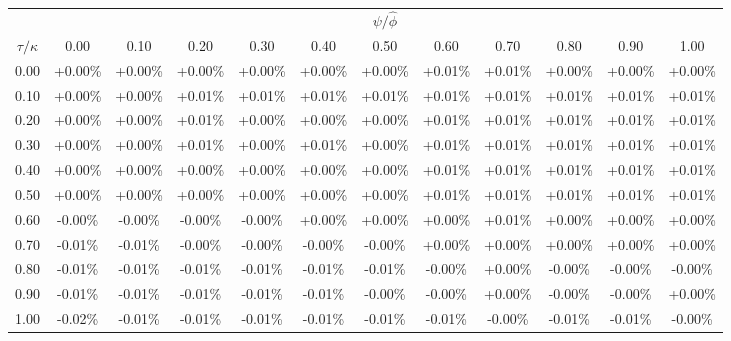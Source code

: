 \begin{tabular}{c|ccccccccccc}
\toprule
 & \multicolumn{11}{c}{$\psi/\widehat{\phi}$} \\
$\tau/\widehat{\kappa}$ & 0.00 & 0.10 & 0.20 & 0.30 & 0.40 & 0.50 & 0.60 & 0.70 & 0.80 & 0.90 & 1.00 \\
\midrule
0.00 & +0.00\% & +0.00\% & +0.00\% & +0.00\% & +0.00\% & +0.00\% & +0.01\% & +0.01\% & +0.00\% & +0.00\% & +0.00\% \\
0.10 & +0.00\% & +0.00\% & +0.01\% & +0.01\% & +0.01\% & +0.01\% & +0.01\% & +0.01\% & +0.01\% & +0.01\% & +0.01\% \\
0.20 & +0.00\% & +0.00\% & +0.01\% & +0.00\% & +0.00\% & +0.00\% & +0.01\% & +0.01\% & +0.01\% & +0.01\% & +0.01\% \\
0.30 & +0.00\% & +0.00\% & +0.01\% & +0.00\% & +0.01\% & +0.00\% & +0.01\% & +0.01\% & +0.01\% & +0.01\% & +0.01\% \\
0.40 & +0.00\% & +0.00\% & +0.00\% & +0.00\% & +0.00\% & +0.00\% & +0.01\% & +0.01\% & +0.01\% & +0.01\% & +0.01\% \\
0.50 & +0.00\% & +0.00\% & +0.00\% & +0.00\% & +0.00\% & +0.00\% & +0.01\% & +0.01\% & +0.01\% & +0.01\% & +0.01\% \\
0.60 & -0.00\% & -0.00\% & -0.00\% & -0.00\% & +0.00\% & +0.00\% & +0.00\% & +0.01\% & +0.00\% & +0.00\% & +0.00\% \\
0.70 & -0.01\% & -0.01\% & -0.00\% & -0.00\% & -0.00\% & -0.00\% & +0.00\% & +0.00\% & +0.00\% & +0.00\% & +0.00\% \\
0.80 & -0.01\% & -0.01\% & -0.01\% & -0.01\% & -0.01\% & -0.01\% & -0.00\% & +0.00\% & -0.00\% & -0.00\% & -0.00\% \\
0.90 & -0.01\% & -0.01\% & -0.01\% & -0.01\% & -0.01\% & -0.00\% & -0.00\% & +0.00\% & -0.00\% & -0.00\% & +0.00\% \\
1.00 & -0.02\% & -0.01\% & -0.01\% & -0.01\% & -0.01\% & -0.01\% & -0.01\% & -0.00\% & -0.01\% & -0.01\% & -0.00\% \\
\bottomrule
\end{tabular}
